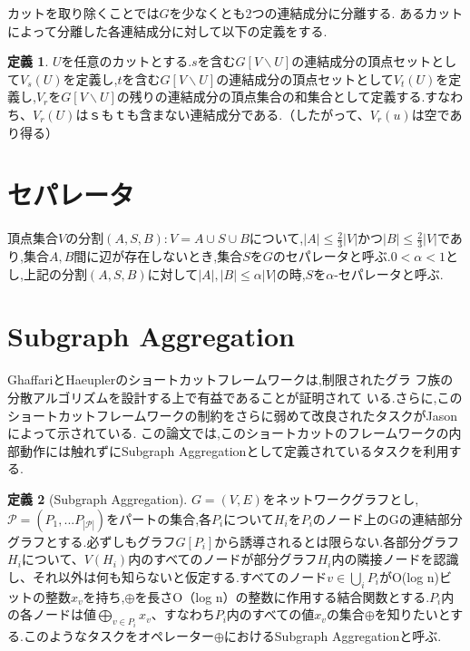 \documentclass{thesis}
\theoremstyle{definition}
\newtheorem{definition}{定義}
\begin{document}
カットを取り除くことでは$G$を少なくとも2つの連結成分に分離する.
あるカットによって分離した各連結成分に対して以下の定義をする.

\begin{definition}
    $U$を任意のカットとする.$s$を含む$G[V\backslash U]$の連結成分の頂点セットとして$V_s(U)$を定義し,$t$を含む$G [V\backslash U]$の連結成分の頂点セットとして$V_t(U)$を定義し,$V_r$を$G [V \backslash U]$の残りの連結成分の頂点集合の和集合として定義する.すなわち、$V_r(U)$は$ｓ$も$ｔ$も含まない連結成分である.（したがって、$V_r(u)$は空であり得る）
\end{definition}

\section{セパレータ}
頂点集合$V$の分割$(A,S,B):V=A \cup S \cup B$について,$|A|\leq \frac{2}{3}|V|$かつ$|B|\leq \frac{2}{3}|V|$であり,集合$A,B$間に辺が存在しないとき,集合$S$を$G$のセパレータと呼ぶ.$0 <\alpha < 1$とし,上記の分割$(A,S,B)$に対して$|A|,|B|\leq \alpha|V|$の時,$S$を$\alpha$-セパレータと呼ぶ.\par


\section{Subgraph Aggregation}
GhaffariとHaeupler\cite{ghaffari2016distributed}のショートカットフレームワークは,制限されたグラ
フ族の分散アルゴリズムを設計する上で有益であることが証明されて
いる.さらに,このショートカットフレームワークの制約をさらに弱めて改良されたタスクがJasonによって示されている.
この論文では,このショートカットのフレームワークの内部動作には触れずにSubgraph Aggregationとして定義されているタスクを利用する.

\begin{definition}[Subgraph Aggregation]
    $G=(V,E)$をネットワークグラフとし,$\mathcal{P} =(P_1,...P_{|\mathcal{P}|})$をパートの集合,各$P_i$について$H_i$を$P_i$のノード上のGの連結部分グラフとする.必ずしもグラフ$G[P_i]$から誘導されるとは限らない.各部分グラフ$H_i$について、$V(H_i)$内のすべてのノードが部分グラフ$H_i$内の隣接ノードを認識し、それ以外は何も知らないと仮定する.すべてのノード$v\in \bigcup_iP_i$がO(log n)ビットの整数$x_v$を持ち,$\oplus$を長さO（log n）の整数に作用する結合関数とする.$P_i$内の各ノードは値$\bigoplus_{v\in P_i}x_v$、すなわち$P_i$内のすべての値$x_v$の集合$\oplus$を知りたいとする.このようなタスクをオペレーター$\oplus$におけるSubgraph Aggregationと呼ぶ.
\end{definition}
\end{document}
